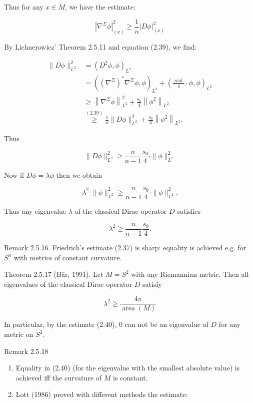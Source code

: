 \documentclass[10pt, letterpaper]{article}
\begin{document}
Thus for any $x \in M$, we have the estimate:

$$
\left|\nabla^{\Sigma} \phi\right|_{(x)}^{2} \geq \frac{1}{n}|D \phi|_{(x)}^{2}
$$

By Lichnerowicz' Theorem 2.5.11 and equation (2.39), we find:

$$
\begin{aligned}
\|D \phi\|_{L^{2}}^{2} & =\left(D^{2} \phi, \phi\right)_{L^{2}} \\
& =\left(\left(\nabla^{\Sigma}\right)^{*} \nabla^{\Sigma} \phi, \phi\right)_{L^{2}}+\left(\frac{\text { scal }}{4} \cdot \phi, \phi\right)_{L^{2}} \\
& \geq\left\|\nabla^{\Sigma} \phi\right\|_{L^{2}}^{2}+\frac{s_{0}}{4}\left\|\phi^{2}\right\|_{L^{2}} \\
& \stackrel{(2.39)}{\geq} \frac{1}{n}\|D \phi\|_{L^{2}}^{2}+\frac{s_{0}}{4}\left\|\phi^{2}\right\|_{L^{2}} .
\end{aligned}
$$

Thus

$$
\|D \phi\|_{L^{2}}^{2} \geq \frac{n}{n-1} \frac{s_{0}}{4} \cdot\|\phi\|_{L^{2}}^{2}
$$

Now if $D \phi=\lambda \phi$ then we obtain

$$
\lambda^{2} \cdot\|\phi\|_{L^{2}}^{2} \geq \frac{n}{n-1} \frac{s_{0}}{4} \cdot\|\phi\|_{L^{2}}^{2} .
$$

Thus any eigenvalue $\lambda$ of the classical Dirac operator $D$ satisfies

$$
\lambda^{2} \geq \frac{n}{n-1} \frac{s_{0}}{4} .
$$

Remark 2.5.16. Friedrich's estimate (2.37) is sharp: equality is achieved e.g. for $S^{n}$ with metrics of constant curvature.

Theorem 2.5.17 (Bär, 1991). Let $M=S^{2}$ with any Riemannian metric. Then all eigenvalues of the classical Dirac operator $D$ satisfy

$$
\lambda^{2} \geq \frac{4 \pi}{\operatorname{area}(M)}
$$

In particular, by the estimate (2.40), 0 can not be an eigenvalue of $D$ for any metric on $S^{2}$.



Remark 2.5.18

\begin{enumerate}
  \item Equality in (2.40) (for the eigenvalue with the smallest absolute value) is achieved iff the curvature of $M$ is constant.
  \item Lott (1986) proved with different methods the estimate:
\end{enumerate}
\end{document}
